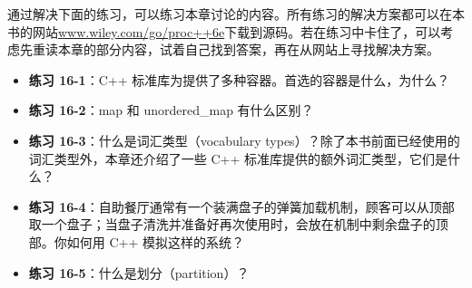 通过解决下面的练习，可以练习本章讨论的内容。所有练习的解决方案都可以在本书的网站\url{www.wiley.com/go/proc++6e}下载到源码。若在练习中卡住了，可以考虑先重读本章的部分内容，试着自己找到答案，再在从网站上寻找解决方案。


\begin{itemize}
\item
\textbf{练习 16-1}：C++ 标准库为提供了多种容器。首选的容器是什么，为什么？

\item
\textbf{练习 16-2}：map 和 unordered\_map 有什么区别？

\item
\textbf{练习 16-3}：什么是词汇类型（vocabulary types）？除了本书前面已经使用的词汇类型外，本章还介绍了一些 C++ 标准库提供的额外词汇类型，它们是什么？

\item
\textbf{练习 16-4}：自助餐厅通常有一个装满盘子的弹簧加载机制，顾客可以从顶部取一个盘子；当盘子清洗并准备好再次使用时，会放在机制中剩余盘子的顶部。你如何用 C++ 模拟这样的系统？

\item
\textbf{练习 16-5}：什么是划分（partition）？
\end{itemize}
